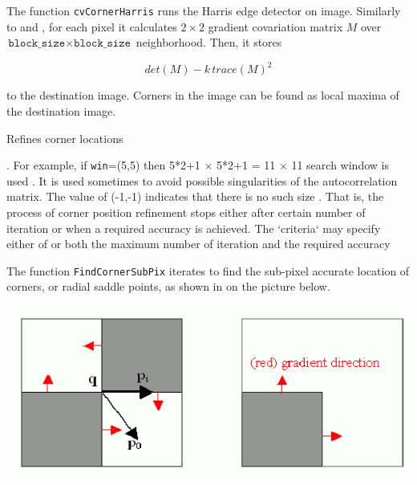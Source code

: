 The function \texttt{cvCornerHarris} runs the Harris edge detector on image. Similarly to  and , for each pixel it calculates $2\times2$ gradient covariation matrix $M$ over $\texttt{block\_size} \times \texttt{block\_size}$ neighborhood. Then, it stores

\[
det(M) - k \, trace(M)^2
\]

to the destination image. Corners in the image can be found as local maxima of the destination image.

\label{FindCornerSubPix}
Refines corner locations


\begin{description}
. For example, if \texttt{win}=(5,5) then 5*2+1 $\times$ 5*2+1 = 11 $\times$ 11 search window is used
. It is used sometimes to avoid possible singularities of the autocorrelation matrix. The value of (-1,-1) indicates that there is no such size
. That is, the process of corner position refinement stops either after certain number of iteration or when a required accuracy is achieved. The `criteria` may specify either of or both the maximum number of iteration and the required accuracy
\end{description}

The function \texttt{FindCornerSubPix} iterates to find the sub-pixel accurate location of corners, or radial saddle points, as shown in on the picture below.

\includegraphics[width=1.0\textwidth]{pics/cornersubpix.png}

